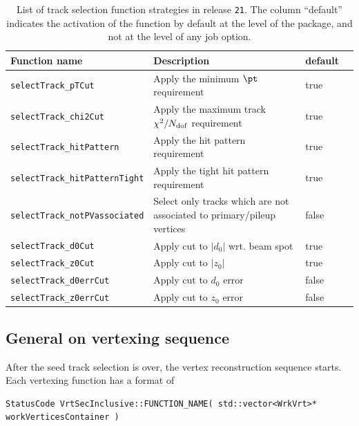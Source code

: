 \documentclass[NOTE, atlasdraft=true, texlive=2018, UKenglish]{\ATLASLATEXPATH atlasdoc}
\begin{document}
\begin{table}[t]
\caption{List of track selection function strategies in release {\tt 21}. The column ``default'' indicates the activation of the function by default at the level of the package, and not at the level of any job option.}
\centering
\begin{scriptsize}
\begin{tabular}{llll}
\hline
\hline
Function name & Description& default\\
\hline
{\tt selectTrack\_pTCut} & Apply the minimum $\pt$ requirement & true\\
{\tt selectTrack\_chi2Cut} & Apply the maximum track $\chi^{2}/N_{\rm dof}$ requirement & true\\
{\tt selectTrack\_hitPattern} & Apply the hit pattern requirement & true\\
{\tt selectTrack\_hitPatternTight} & Apply the tight hit pattern requirement & true\\
{\tt selectTrack\_notPVassociated} & Select only tracks which are not associated to primary/pileup vertices & false \\
{\tt selectTrack\_d0Cut} & Apply cut to $|d_{0}|$ wrt. beam spot & true\\
{\tt selectTrack\_z0Cut} & Apply cut to $|z_{0}|$& true\\
{\tt selectTrack\_d0errCut} & Apply cut to $d_{0}$ error & false\\
{\tt selectTrack\_z0errCut} & Apply cut to $z_{0}$ error & false\\
\hline
\hline
\end{tabular}
\end{scriptsize}
\label{tbl:trackSelection}
\end{table}%

\subsection{General on vertexing sequence}
After the seed track selection is over, the vertex reconstruction sequence starts. Each vertexing function has a format of 

\begin{scriptsize}
\begin{verbatim}
StatusCode VrtSecInclusive::FUNCTION_NAME( std::vector<WrkVrt>* workVerticesContainer )
\end{verbatim}
\end{scriptsize}
\end{document}
